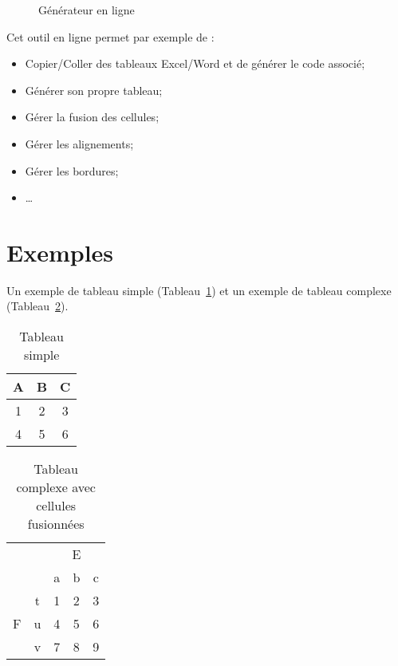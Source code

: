 \documentclass[a4paper,12pt]{report}
\begin{document}
\begin{figure}[hbtp]
	\centering
	\def\svgwidth{1\columnwidth}
	\fontsize{10pt}{10pt}\selectfont
	\caption{Générateur en ligne}
	\label{figure_generateur_tableau}
\end{figure}

Cet outil en ligne permet par exemple de :
\begin{itemize}
\item Copier/Coller des tableaux Excel/Word et de générer le code associé;
\item Générer son propre tableau;
\item Gérer la fusion des cellules;
\item Gérer les alignements;
\item Gérer les bordures;
\item \ldots
\end{itemize}


\section{Exemples}

Un exemple de tableau simple (Tableau~\ref{tableau_simple}) et un exemple de tableau complexe (Tableau~\ref{tableau_complexe}).
\begin{table}[hbtp]
\centering
\begin{tabular}{|c|c|c|}
\hline
A & B & C \\ \hline
1 & 2 & 3 \\ \hline
4 & 5 & 6 \\ \hline
\end{tabular}
\caption{Tableau simple}
\label{tableau_simple}
\end{table}


\begin{table}[hbtp]
\centering
\begin{tabular}{|c|c|c|c|c|}
\hline
\multicolumn{2}{|c|}{\multirow{2}{*}{}} & \multicolumn{3}{c|}{E} \\ \cline{3-5} 
\multicolumn{2}{|c|}{}                  & a      & b     & c     \\ \hline
\multirow{3}{*}{F}          & t         & 1      & 2     & 3     \\ \cline{2-5} 
                            & u         & 4      & 5     & 6     \\ \cline{2-5} 
                            & v         & 7      & 8     & 9     \\ \hline
\end{tabular}
\caption{Tableau complexe avec cellules fusionnées}
\label{tableau_complexe}
\end{table}

\end{document}

